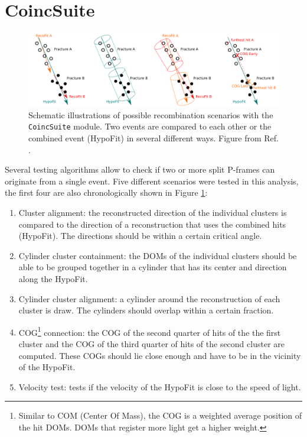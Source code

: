 \section{CoincSuite}
\begin{figure}[t]
\centering
\includegraphics[width=\textwidth]{chapter7/img/coincsuite.png}
\caption{Schematic illustrations of possible recombination scenarios with the \texttt{CoincSuite} module. Two events are compared to each other or the combined event (HypoFit) in several different ways. Figure from Ref. \cite{mzollthesis}.}
\label{fig:coincsuite}
\end{figure}
Several testing algorithms allow to check if two or more split P-frames can originate from a single event. Five different scenarios were tested in this analysis, the first four are also chronologically shown in Figure \ref{fig:coincsuite}:
\vspace{2mm}

\begin{enumerate}
\item Cluster alignment: the reconstructed direction of the individual clusters is compared to the direction of a reconstruction that uses the combined hits (HypoFit). The directions should be within a certain critical angle.
\item Cylinder cluster containment: the DOMs of the individual clusters should be able to be grouped together in a cylinder that has its center and direction along the HypoFit.
\item Cylinder cluster alignment: a cylinder around the reconstruction of each cluster is draw. The cylinders should overlap within a certain fraction.
\item COG\footnote{Similar to COM (Center Of Mass), the COG is a weighted average position of the hit DOMs. DOMs that register more light get a higher weight.}\label{footnote:cog} connection: the COG of the second quarter of hits of the the first cluster and the COG of the third quarter of hits of the second cluster are computed. These COGs should lie close enough and have to be in the vicinity of the HypoFit.
\item Velocity test: tests if the velocity of the HypoFit is close to the speed of light.
\end{enumerate}

